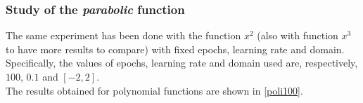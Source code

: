 \documentclass[a4paper, 11pt]{article}
\begin{document}
\subsubsection{Study of the \textit{parabolic} function}
The same experiment has been done with the function $x^2$ (also with function $x^3$ to have more results to compare) with fixed epochs, learning rate and domain.\\
Specifically, the values of epochs, learning rate and domain used are, respectively, $100$, $0.1$ and $[-2,2]$.\\
The results obtained for polynomial functions are shown in \ref{poli100}.
\begin{figure}[h!]
    \centering
     \hspace{0.5em}
     \hspace{0.5em}

\end{figure}
\end{document}

